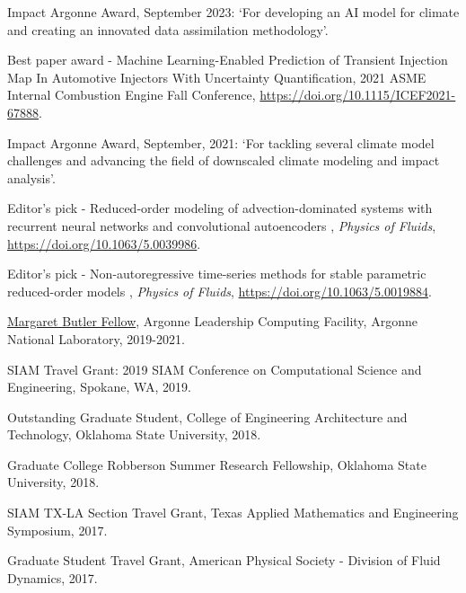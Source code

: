\documentclass[letterpaper]{article}
\renewenvironment{itemize}{
  \begin{list}{}{
    \setlength{\leftmargin}{1.5em}
  }
}{
  \end{list}
}
\begin{document}
\begin{itemize}

\item Impact Argonne Award, September 2023: `For developing an AI model for climate and creating an innovated data assimilation methodology'.

\item Best paper award - Machine Learning-Enabled Prediction of Transient Injection Map In Automotive Injectors With Uncertainty Quantification, 2021 ASME Internal Combustion Engine Fall Conference, \url{https://doi.org/10.1115/ICEF2021-67888}.

\item Impact Argonne Award, September, 2021: `For tackling several climate model challenges and advancing the field of downscaled climate modeling and impact analysis'.

\item Editor's pick - Reduced-order modeling of advection-dominated systems with recurrent neural networks and convolutional autoencoders , {\it Physics of Fluids}, \url{https://doi.org/10.1063/5.0039986}.

\item Editor's pick - Non-autoregressive time-series methods for stable parametric reduced-order models , {\it Physics of Fluids}, \url{https://doi.org/10.1063/5.0019884}.

\item \href{https://www.alcf.anl.gov/margaret-butler-fellowship-computational-science}{Margaret Butler Fellow}, Argonne Leadership Computing Facility, Argonne National Laboratory, 2019-2021.

\item SIAM Travel Grant: 2019 SIAM Conference on Computational Science and Engineering, Spokane, WA, 2019.

\item Outstanding Graduate Student, College of Engineering Architecture and Technology, Oklahoma State University, 2018.

\item Graduate College Robberson Summer Research Fellowship, Oklahoma State University, 2018.

\item SIAM TX-LA Section Travel Grant, Texas Applied Mathematics and Engineering Symposium, 2017.

\item Graduate Student Travel Grant, American Physical Society - Division of Fluid Dynamics, 2017.


\end{itemize}
\end{document}
